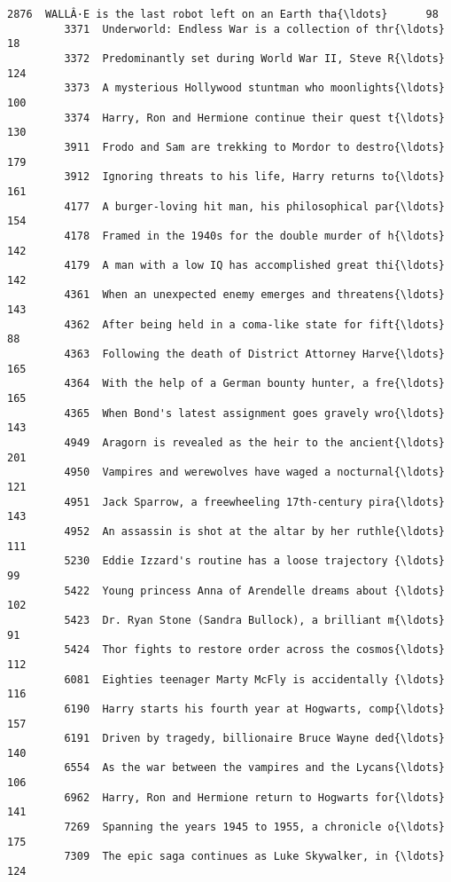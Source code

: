 \documentclass[11pt]{article}
\begin{document}
\begin{Verbatim}[commandchars=\\\{\}]
         2876  WALLÂ·E is the last robot left on an Earth tha{\ldots}      98   
         3371  Underworld: Endless War is a collection of thr{\ldots}      18   
         3372  Predominantly set during World War II, Steve R{\ldots}     124   
         3373  A mysterious Hollywood stuntman who moonlights{\ldots}     100   
         3374  Harry, Ron and Hermione continue their quest t{\ldots}     130   
         3911  Frodo and Sam are trekking to Mordor to destro{\ldots}     179   
         3912  Ignoring threats to his life, Harry returns to{\ldots}     161   
         4177  A burger-loving hit man, his philosophical par{\ldots}     154   
         4178  Framed in the 1940s for the double murder of h{\ldots}     142   
         4179  A man with a low IQ has accomplished great thi{\ldots}     142   
         4361  When an unexpected enemy emerges and threatens{\ldots}     143   
         4362  After being held in a coma-like state for fift{\ldots}      88   
         4363  Following the death of District Attorney Harve{\ldots}     165   
         4364  With the help of a German bounty hunter, a fre{\ldots}     165   
         4365  When Bond's latest assignment goes gravely wro{\ldots}     143   
         4949  Aragorn is revealed as the heir to the ancient{\ldots}     201   
         4950  Vampires and werewolves have waged a nocturnal{\ldots}     121   
         4951  Jack Sparrow, a freewheeling 17th-century pira{\ldots}     143   
         4952  An assassin is shot at the altar by her ruthle{\ldots}     111   
         5230  Eddie Izzard's routine has a loose trajectory {\ldots}      99   
         5422  Young princess Anna of Arendelle dreams about {\ldots}     102   
         5423  Dr. Ryan Stone (Sandra Bullock), a brilliant m{\ldots}      91   
         5424  Thor fights to restore order across the cosmos{\ldots}     112   
         6081  Eighties teenager Marty McFly is accidentally {\ldots}     116   
         6190  Harry starts his fourth year at Hogwarts, comp{\ldots}     157   
         6191  Driven by tragedy, billionaire Bruce Wayne ded{\ldots}     140   
         6554  As the war between the vampires and the Lycans{\ldots}     106   
         6962  Harry, Ron and Hermione return to Hogwarts for{\ldots}     141   
         7269  Spanning the years 1945 to 1955, a chronicle o{\ldots}     175   
         7309  The epic saga continues as Luke Skywalker, in {\ldots}     124   
         

\end{Verbatim}
\end{document}

